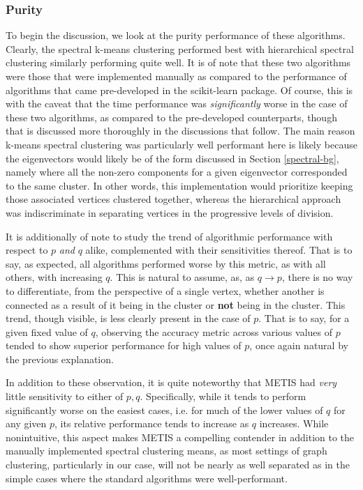 \documentclass{article}
\begin{document}
\subsubsection{Purity}
To begin the discussion, we look at the purity performance of these algorithms. Clearly, the spectral k-means clustering performed best with hierarchical spectral clustering similarly performing quite well. It is of note that these two algorithms were those that were implemented manually as compared to the performance of algorithms that came pre-developed in the scikit-learn package. Of course, this is with the caveat that the time performance was \textit{significantly} worse in the case of these two algorithms, as compared to the pre-developed counterparts, though that is discussed more thoroughly in the discussions that follow. The main reason k-means spectral clustering was particularly well performant here is likely because the eigenvectors would likely be of the form discussed in Section \ref{spectral-bg}, namely where all the non-zero components for a given eigenvector corresponded to the same cluster. In other words, this implementation would prioritize keeping those associated vertices clustered together, whereas the hierarchical approach was indiscriminate in separating vertices in the progressive levels of division.

It is additionally of note to study the trend of algorithmic performance with respect to $p$ \textit{and} $q$ alike, complemented with their sensitivities thereof. That is to say, as expected, all algorithms performed worse by this metric, as with all others, with increasing $q$. This is natural to assume, as, as $q\rightarrow p$, there is no way to differentiate, from the perspective of a single vertex, whether another is connected as a result of it being in the cluster or \textbf{not} being in the cluster. This trend, though visible, is less clearly present in the case of $p$. That is to say, for a given fixed value of $q$, observing the accuracy metric across various values of $p$ tended to show superior performance for high values of $p$, once again natural by the previous explanation.

In addition to these observation, it is quite noteworthy that METIS had \textit{very} little sensitivity to either of $p,q$. Specifically, while it tends to perform significantly worse on the easiest cases, i.e. for much of the lower values of $q$ for any given $p$, its relative performance tends to increase as $q$ increases. While nonintuitive, this aspect makes METIS a compelling contender in addition to the manually implemented spectral clustering means, as most settings of graph clustering, particularly in our case, will not be nearly as well separated as in the simple cases where the standard algorithms were well-performant.
\end{document}
